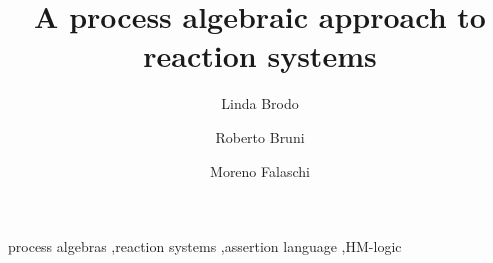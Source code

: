 \documentclass{elsarticle}
\begin{document}
\begin{frontmatter}

\title{A process algebraic approach to reaction systems}



 \author[uniss]{Linda Brodo}
 
 \author[unipi]{Roberto Bruni}
 
 \author[unisi]{Moreno Falaschi}
 
 \address[unipi]{Dipartimento di Informatica, Universit\`{a} di Pisa, Italy}
 \address[uniss]{Dipartimento di Scienze Economiche e Aziendali,   Universit\`a di Sassari, Italy}
 \address[unisi]{Dipartimento di Ingegneria,   Universit\`a di Siena, Italy}
 



\begin{abstract}

\end{abstract}

\begin{keyword}
process algebras \sep reaction systems \sep assertion language \sep HM-logic
\end{keyword}

\end{frontmatter}

\linenumbers





%


%





%



\appendix

\end{document}
